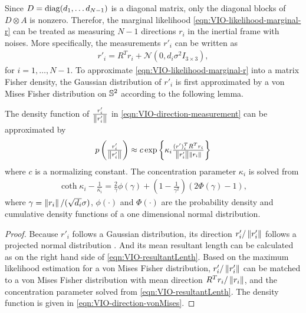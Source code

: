 Since $D = \mathrm{diag}(d_1,\ldots d_{N-1})$ is a diagonal matrix, only the diagonal blocks of $D\otimes A$ is nonzero.
Therefor, the marginal likelihood \eqref{eqn:VIO-likelihood-marginal-r} can be treated as measuring $N-1$ directions $r_i$ in the inertial frame with noises.
More specifically, the measurements $r'_i$ can be written as
\begin{align} \label{eqn:VIO-direction-measurement}
	r'_i = R^Tr_i + \mathcal{N}(0, d_i\sigma^2 I_{3\times 3}),
\end{align}
for $i = 1,\ldots,N-1$.
To approximate \eqref{eqn:VIO-likelihood-marginal-r} into a matrix Fisher density, the Gaussian distribution of $r'_i$ is first approximated by a von Mises Fisher distribution on $\mathbb{S}^2$ according to the following lemma.

\begin{lemma} \label{thm:VIO-GaussToVM}
	The density function of $\tfrac{r'_i}{\left\| r'_i \right\|}$ in \eqref{eqn:VIO-direction-measurement} can be approximated by
	\begin{align} \label{eqn:VIO-direction-vonMises}
		p\left( \tfrac{r'_i}{\left\| r'_i \right\|} \right) \approx c \exp\left\{ \kappa_i \tfrac{(r')_i^TR^Tr_i}{\left\| r'_i \right\|\left\| r_i \right\|} \right\}
	\end{align}
	where $c$ is a normalizing constant. The concentration parameter $\kappa_i$ is solved from
	\begin{align} \label{eqn:VIO-resultantLenth}
		\coth\kappa_i - \frac{1}{\kappa_i} = \frac{2}{\gamma} \phi(\gamma) + \left( 1-\frac{1}{\gamma^2} \right) (2\Phi(\gamma)-1),
	\end{align}
	where $\gamma = \left\| r_i \right\|/(\sqrt{d_i}\sigma)$, $\phi(\cdot)$ and $\Phi(\cdot)$ are the probability density and cumulative density functions of a one dimensional normal distribution.
\end{lemma}
\begin{proof}
	Because $r'_i$ follows a Gaussian distribution, its direction $r'_i/\left\| r'_i \right\|$ follows a projected normal distribution \cite{mardia2009directional}.
	And its mean resultant length \cite{presnell2008mean} can be calculated as on the right hand side of \eqref{eqn:VIO-resultantLenth}.
	Based on the maximum likelihood estimation \cite{mardia2009directional} for a von Mises Fisher distribution, $r'_i/\left\| r'_i \right\|$ can be matched to a von Mises Fisher distribution with mean direction $R^Tr_i/\left\| r_i \right\|$, and the concentration parameter solved from \eqref{eqn:VIO-resultantLenth}.
	The density function is given in \eqref{eqn:VIO-direction-vonMises}.
\end{proof}

